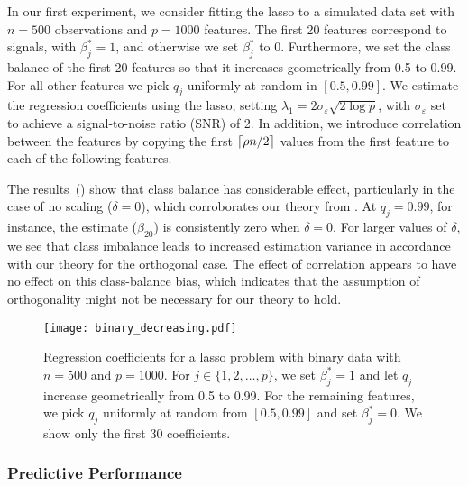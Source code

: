 In our first experiment, we consider fitting the lasso to a simulated data set with
\(n=500\) observations and \(p = \num{1000}\) features. The first 20 features correspond to
signals, with \(\beta_j^* = 1\), and otherwise we set \(\beta_j^*\) to 0. Furthermore, we
set the class balance of the first 20 features so that it increases geometrically from 0.5
to 0.99. For all other features we pick \(q_j\) uniformly at random in \([0.5,0.99]\). We
estimate the regression coefficients using the lasso, setting \(\lambda_1 = 2
\sigma_\varepsilon \sqrt{2 \log p }\), with \(\sigma_\varepsilon\) set to achieve a
signal-to-noise ratio (SNR) of 2. In addition, we introduce correlation between the
features by copying the first \(\lceil \rho n/2 \rceil\) values from the first feature to each of
the following features.

The results~() show that class balance has considerable effect,
particularly in the case of no scaling (\(\delta = 0\)), which corroborates our theory from
. At \(q_j=0.99\), for instance, the estimate
(\(\hat{\beta}_{20}\)) is consistently zero when \(\delta = 0\). For larger values of
\(\delta\), we see that class imbalance leads to increased estimation variance in
accordance with our theory for the orthogonal case. The effect of correlation appears to
have no effect on this class-balance bias, which indicates that the assumption of
orthogonality might not be necessary for our theory to hold.

\begin{figure}[htpb]
  \centering
  \texttt{[image: binary\_decreasing.pdf]}
  \caption{%
    Regression coefficients for a lasso problem with binary data with \(n = 500\) and \(p =
    \num{1000}\). For \(j \in \{1,2,\dots,p\}\), we set \(\beta_j^* = 1\) and
    let \(q_j\) increase geometrically from 0.5 to 0.99. For the remaining features,
    we pick \(q_j\) uniformly at random from \([0.5, 0.99]\) and
    set \(\beta_j^* = 0\). We show only the first 30 coefficients.
  }
  \label{fig:binary-decreasing}
\end{figure}

\subsubsection{Predictive Performance}
\label{sec:experiments-predictive-performance}

